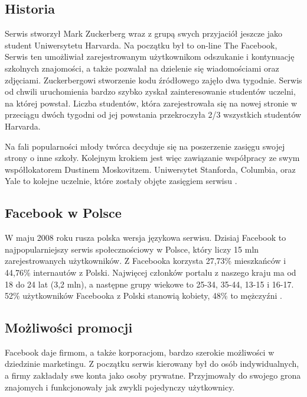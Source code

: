 \subsection{Historia}
Serwis stworzył Mark Zuckerberg wraz z grupą swych przyjaciół jeszcze jako student Uniwersytetu Harvarda. Na początku był to on-line The Facebook, Serwis ten umożliwiał zarejestrowanym użytkownikom odszukanie i kontynuację szkolnych znajomości, a także pozwalał na dzielenie się wiadomościami oraz zdjęciami. Zuckerbergowi stworzenie kodu źródłowego zajęło dwa tygodnie. Serwis od chwili uruchomienia bardzo szybko zyskał zainteresowanie studentów uczelni, na której powstał. Liczba studentów, która zarejestrowała się na nowej stronie w przeciągu dwóch tygodni od jej powstania  przekroczyła 2/3 wszystkich studentów Harvarda.

Na fali popularności młody twórca decyduje się na poszerzenie zasięgu swojej strony o inne szkoły. Kolejnym krokiem jest więc zawiązanie współpracy ze swym współlokatorem Dustinem Moskovitzem. Uniwersytet Stanforda, Columbia, oraz Yale to kolejne uczelnie, które zostały objęte zasięgiem serwisu \cite{url:wiki-facebook}.


\subsection{Facebook w Polsce}
\label{subsec:facebook-w-polsce}
W maju 2008 roku rusza polska wersja językowa serwisu. Dzisiaj Facebook to najpopularniejszy serwis społecznościowy w Polsce, który liczy 15 mln zarejestrowanych użytkowników. Z Facebooka korzysta 27,73\% mieszkańców i 44,76\% internautów z Polski. Najwięcej członków portalu z naszego kraju ma od 18 do 24 lat (3,2 mln), a następne grupy wiekowe to 25-34, 35-44, 13-15 i 16-17. 52\% użytkowników Facebooka z Polski stanowią kobiety, 48\% to mężczyźni \cite{url:wp-facebook-w-polsce}.


\subsection{Możliwości promocji}
Facebook daje firmom, a także korporacjom, bardzo szerokie możliwości w dziedzinie marketingu. Z początku serwis kierowany był do osób indywidualnych, a firmy zakładały swe konta jako osoby prywatne. Przyjmowały do swojego grona znajomych  i funkcjonowały jak zwykli pojedynczy użytkownicy. 

